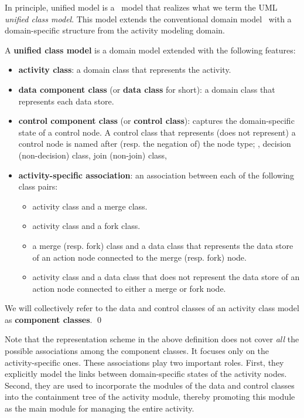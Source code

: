 In principle, unified model is a \dcsl~model that realizes what we term the UML \textit{unified class model}. This model extends the conventional domain model~\cite{evans_domain-driven_2004} with a domain-specific structure from the activity modeling domain.
%
\begin{definition} \label{def:unified-class-model}
	A \textbf{unified class model} is a domain model extended with the following features:
	
	\begin{itemize}%
		\item \textbf{activity class}: a domain class that represents the activity.
		\item \textbf{data component class} (or \textbf{data class} for short): a domain class that represents each data store.
		\item \textbf{control component class} (or \textbf{control class}): captures the domain-specific state of a control node. A control class that represents (does not represent) a control node is named after (resp. the negation of) the node type; \eg, decision (non-decision) class, join (non-join) class, \etc
		\item \textbf{activity-specific association}: an association between each of the following class pairs:
		\begin{itemize}
			\item activity class and a merge class.
			\item activity class and a fork class.
			\item a merge (resp. fork) class and a data class that represents the data store of an action node connected to the merge (resp. fork) node.
			\item activity class and a data class that does not represent the data store of an action node connected to either a merge or fork node.
		\end{itemize}        	
	\end{itemize}
	We will collectively refer to the data and control classes of an activity class model as \textbf{component classes}. \qed
\end{definition}

Note that the representation scheme in the above definition does not cover \textit{all} the possible associations among the component classes. It focuses only on the activity-specific ones. 
%
These associations play two important roles. First, they explicitly model the links between domain-specific states of the activity nodes. Second, they are used to incorporate the modules of the data and control classes into the containment tree of the activity module, thereby promoting this module as the main module for managing the entire activity.

